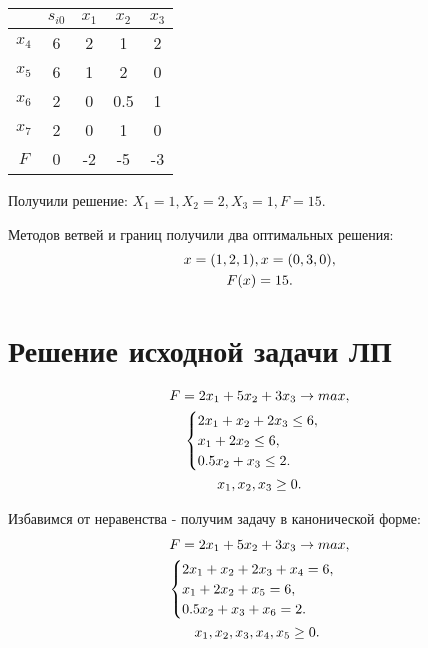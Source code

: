 \documentclass[12pt,a4paper,oneside]{extarticle}
\begin{document}
        \begin{center}
            \begin{tabular}{|c|c|c|c|c|}
                \hline
                     & $s_{i0}$ & $x_1$ & $x_2$ & $x_3$ \\ \hline
                $x_4$ & 6       & 2     & 1     & 2 \\ \hline
                $x_5$ & 6       & 1     & 2     & 0 \\ \hline
                $x_6$ & 2       & 0     & 0.5   & 1 \\ \hline
                $x_7$ & 2       & 0     & 1     & 0 \\ \hline
                $F$   & 0       & -2    & -5    & -3 \\ \hline
            \end{tabular}
        \end{center}

        Получили решение: $X_1=1, X_2=2, X_3=1,  F=15$.

    Методов ветвей и границ получили два оптимальных решения:
    \begin{gather}
        x = (1,2,1), x = (0,3,0), \notag \\
        F(x) = 15. \notag
    \end{gather}
    
\clearpage

\section{Решение исходной задачи ЛП}
    \label{sec:pz}
    \begin{gather}
        F = 2x_1+5x_2+3x_3 \rightarrow max,  \notag  \\
        \begin{cases}
            2x_1 + x_2 + 2x_3 \leq 6, \\
            x_1 + 2x_2 \leq 6, \\
            0.5x_2 + x_3 \leq 2.
        \end{cases} \notag \\
        x_1, x_2, x_3 \geq 0. \notag
    \end{gather} 

    Избавимся от неравенства - получим задачу в канонической форме:
    \begin{gather}
        F = 2x_1+5x_2+3x_3 \rightarrow max,  \notag  \\
        \begin{cases}
            2x_1 + x_2 + 2x_3 + x_4 = 6, \\
            x_1 + 2x_2 + x_5 = 6, \\
            0.5x_2 + x_3 + x_6 = 2.
        \end{cases} 
        \notag \\ x_1, x_2, x_3, x_4, x_5 \geq 0. \
    \end{gather} 
\end{document}
